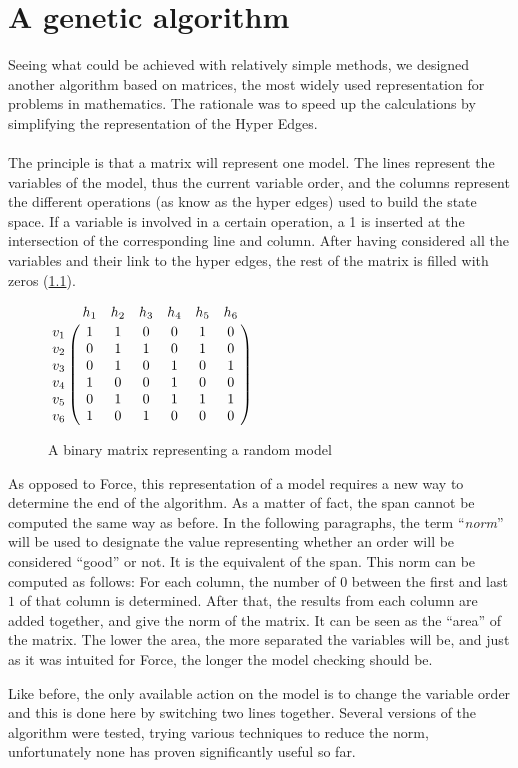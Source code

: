 \documentclass[12pt]{report}
\begin{document}
\chapter{A genetic algorithm}

Seeing what could be achieved with relatively simple methods, we designed another algorithm based on matrices, the most widely used representation for problems in mathematics. The rationale was to speed up the calculations by simplifying the representation of the Hyper Edges.
\\\\
The principle is that a matrix will represent one model. The lines represent the variables of the model, thus the current variable order, and the columns represent the different operations (as know as the hyper edges) used to build the state space. If a variable is involved in a certain operation, a 1 is inserted at the intersection of the corresponding line and column. After having considered all the variables and their link to the hyper edges, the rest of the matrix is filled with zeros (\ref{example_matrix}).

\begin{figure}[!h]
  \centering
  $\bordermatrix{
  ~ & h_1 & h_2 & h_3 & h_4 & h_5 & h_6 \cr
  v_1 & 1 & 1 & 0 & 0 & 1 & 0 \cr
  v_2 & 0 & 1 & 1 & 0 & 1 & 0 \cr
  v_3 & 0 & 1 & 0 & 1 & 0 & 1 \cr
  v_4 & 1 & 0 & 0 & 1 & 0 & 0 \cr
  v_5 & 0 & 1 & 0 & 1 & 1 & 1 \cr
  v_6 & 1 & 0 & 1 & 0 & 0 & 0\cr
  }$
  \caption{A binary matrix representing a random model}
  \label{example_matrix}
\end{figure}

As opposed to Force, this representation of a model requires a new way to determine the end of the algorithm. As a matter of fact, the span cannot be computed the same way as before. In the following paragraphs, the term \enquote{\it{norm}} will be used to designate the value representing whether an order will be considered \enquote{good} or not. It is the equivalent of the span. 
This norm can be computed as follows:
For each column, the number of $0$ between the first and last $1$ of that column is determined. After that, the results from each column are added together, and give the norm of the matrix. It can be seen as the \enquote{area} of the matrix. The lower the area, the more separated the variables will be, and just as it was intuited for Force, the longer the model checking should be.

Like before, the only available action on the model is to change the variable order and this is done here by switching two lines together. Several versions of the algorithm were tested, trying various techniques to reduce the norm, unfortunately none has proven significantly useful so far. 
\end{document}
